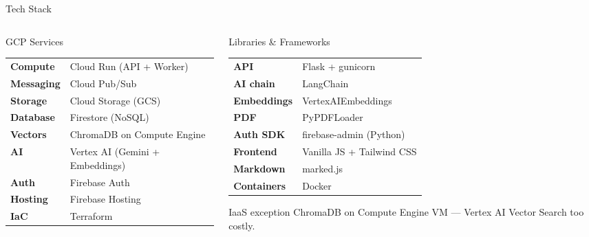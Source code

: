 \documentclass[aspectratio=169]{beamer}
\begin{document}
\begin{frame}[t,shrink=3]{Tech Stack}
  \begin{columns}[t]
    \begin{column}{0.48\textwidth}
      \begin{block}{GCP Services}
        {\footnotesize\renewcommand{\arraystretch}{1.2}
        \begin{tabular}{@{}ll@{}}
          \textbf{Compute}   & Cloud Run (API + Worker) \\
          \textbf{Messaging} & Cloud Pub/Sub \\
          \textbf{Storage}   & Cloud Storage (GCS) \\
          \textbf{Database}  & Firestore (NoSQL) \\
          \textbf{Vectors}   & ChromaDB on Compute Engine \\
          \textbf{AI}        & Vertex AI (Gemini + Embeddings) \\
          \textbf{Auth}      & Firebase Auth \\
          \textbf{Hosting}   & Firebase Hosting \\
          \textbf{IaC}       & Terraform \\
        \end{tabular}}
      \end{block}
    \end{column}
    \begin{column}{0.48\textwidth}
      \begin{block}{Libraries \& Frameworks}
        {\footnotesize\renewcommand{\arraystretch}{1.2}
        \begin{tabular}{@{}ll@{}}
          \textbf{API}        & Flask + gunicorn \\
          \textbf{AI chain}   & LangChain \\
          \textbf{Embeddings} & VertexAIEmbeddings \\
          \textbf{PDF}        & PyPDFLoader \\
          \textbf{Auth SDK}   & firebase-admin (Python) \\
          \textbf{Frontend}   & Vanilla JS + Tailwind CSS \\
          \textbf{Markdown}   & marked.js \\
          \textbf{Containers} & Docker \\
        \end{tabular}}
      \end{block}
      \vspace{0.2cm}
      \begin{alertblock}{IaaS exception}
        {\footnotesize ChromaDB on Compute Engine VM —
        Vertex AI Vector Search too costly.}
      \end{alertblock}
    \end{column}
  \end{columns}
\end{frame}
\end{document}
